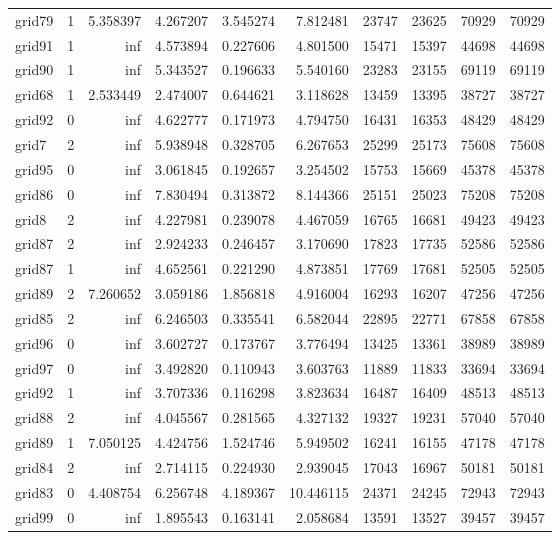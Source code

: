\begin{longtable}{|l|r|r|r|r|r|r|r|r|r|}
grid79 & 1 & 5.358397 & 4.267207 & 3.545274 & 7.812481 & 23747 & 23625 & 70929 & 70929 \\
grid91 & 1 & inf & 4.573894 & 0.227606 & 4.801500 & 15471 & 15397 & 44698 & 44698 \\
grid90 & 1 & inf & 5.343527 & 0.196633 & 5.540160 & 23283 & 23155 & 69119 & 69119 \\
grid68 & 1 & 2.533449 & 2.474007 & 0.644621 & 3.118628 & 13459 & 13395 & 38727 & 38727 \\
grid92 & 0 & inf & 4.622777 & 0.171973 & 4.794750 & 16431 & 16353 & 48429 & 48429 \\
grid7 & 2 & inf & 5.938948 & 0.328705 & 6.267653 & 25299 & 25173 & 75608 & 75608 \\
grid95 & 0 & inf & 3.061845 & 0.192657 & 3.254502 & 15753 & 15669 & 45378 & 45378 \\
grid86 & 0 & inf & 7.830494 & 0.313872 & 8.144366 & 25151 & 25023 & 75208 & 75208 \\
grid8 & 2 & inf & 4.227981 & 0.239078 & 4.467059 & 16765 & 16681 & 49423 & 49423 \\
grid87 & 2 & inf & 2.924233 & 0.246457 & 3.170690 & 17823 & 17735 & 52586 & 52586 \\
grid87 & 1 & inf & 4.652561 & 0.221290 & 4.873851 & 17769 & 17681 & 52505 & 52505 \\
grid89 & 2 & 7.260652 & 3.059186 & 1.856818 & 4.916004 & 16293 & 16207 & 47256 & 47256 \\
grid85 & 2 & inf & 6.246503 & 0.335541 & 6.582044 & 22895 & 22771 & 67858 & 67858 \\
grid96 & 0 & inf & 3.602727 & 0.173767 & 3.776494 & 13425 & 13361 & 38989 & 38989 \\
grid97 & 0 & inf & 3.492820 & 0.110943 & 3.603763 & 11889 & 11833 & 33694 & 33694 \\
grid92 & 1 & inf & 3.707336 & 0.116298 & 3.823634 & 16487 & 16409 & 48513 & 48513 \\
grid88 & 2 & inf & 4.045567 & 0.281565 & 4.327132 & 19327 & 19231 & 57040 & 57040 \\
grid89 & 1 & 7.050125 & 4.424756 & 1.524746 & 5.949502 & 16241 & 16155 & 47178 & 47178 \\
grid84 & 2 & inf & 2.714115 & 0.224930 & 2.939045 & 17043 & 16967 & 50181 & 50181 \\
grid83 & 0 & 4.408754 & 6.256748 & 4.189367 & 10.446115 & 24371 & 24245 & 72943 & 72943 \\
grid99 & 0 & inf & 1.895543 & 0.163141 & 2.058684 & 13591 & 13527 & 39457 & 39457 \\

\end{longtable}
